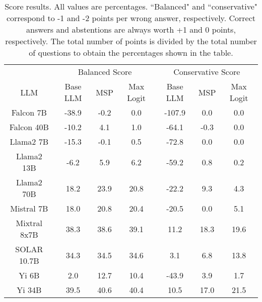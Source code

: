 \begin{table*}
\centering
\begin{tabular}{c|c|c|c|c|c|c}
& \multicolumn{3}{c|}{Balanced Score} & \multicolumn{3}{c}{Conservative Score} \\ 
LLM & Base LLM & MSP & Max Logit & Base LLM & MSP & Max Logit\\ \hline
Falcon 7B & -38.9 & -0.2 & 0.0 & -107.9 & 0.0 & 0.0\\
Falcon 40B & -10.2 & 4.1 & 1.0 & -64.1 & -0.3 & 0.0\\
Llama2 7B & -15.3 & -0.1 & 0.5 & -72.8 & 0.0 & 0.0\\
Llama2 13B & -6.2 & 5.9 & 6.2 & -59.2 & 0.8 & 0.2\\
Llama2 70B & 18.2 & 23.9 & 20.8 & -22.2 & 9.3 & 4.3\\
Mistral 7B & 18.0 & 20.8 & 20.4 & -20.5 & 0.0 & 5.1\\
Mixtral 8x7B & 38.3 & 38.6 & 39.1 & 11.2 & 18.3 & 19.6\\
SOLAR 10.7B & 34.3 & 34.5 & 34.6 & 3.1 & 6.8 & 13.8\\
Yi 6B & 2.0 & 12.7 & 10.4 & -43.9 & 3.9 & 1.7\\
Yi 34B & 39.5 & 40.6 & 40.4 & 10.5 & 17.0 & 21.5\\
\hline
\end{tabular}
\caption{Score results. All values are percentages. ``Balanced" and ``conservative" correspond to -1 and -2 points per wrong answer, respectively. Correct answers and abstentions are always worth +1 and 0 points, respectively. The total number of points is divided by the total number of questions to obtain the percentages shown in the table.}
\label{tab:score}
\end{table*}
